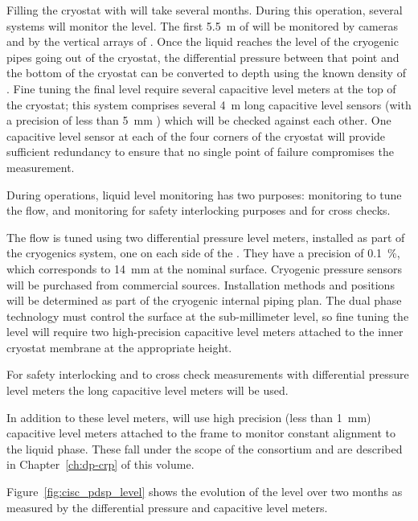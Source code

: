 Filling the cryostat with \lar will take several months. During this operation, several systems will monitor the \lar level. 
The first \SI{5.5}{m} of  will be monitored by cameras and by the vertical arrays of . Once the liquid reaches the level of the cryogenic pipes going out of the cryostat, 
the differential pressure between that point and the bottom of the cryostat
can be converted to depth using
the known density of \lar.  Fine tuning the final  level require several capacitive level meters at the top of the cryostat; this system comprises several \SI{4}{m}  long capacitive level sensors (with a precision of less than \SI{5}{mm} ) which will be checked against each other. One capacitive level sensor at each of the four corners of the cryostat will provide sufficient redundancy to ensure that no single point of failure compromises the %
measurement.


During operations, liquid level monitoring has two purposes:
monitoring to tune the \lar flow, and monitoring for safety interlocking purposes and for cross checks. 


The \lar flow is tuned using two differential pressure level meters, installed as part of the cryogenics system, one on each side of the .  They have a precision of \SI{0.1}{\%}, which corresponds to \SI{14}{mm} at the nominal  surface. Cryogenic pressure sensors will be purchased from commercial sources. Installation methods and positions will be determined as part of the cryogenic internal piping plan. 
The dual phase technology must control the  surface at the sub-millimeter level, so fine tuning the  level will require two high-precision capacitive level meters attached to the inner cryostat membrane at the appropriate height.   


For %
safety interlocking and to cross check measurements with differential pressure level meters the long capacitive level meters will be used. 


In addition to these level meters,  will use high precision (less than \SI{1}{mm}) capacitive level meters attached to the  frame to monitor constant  alignment to the liquid phase. These fall under the scope of the  consortium and are described in Chapter~\ref{ch:dp-crp} of this  volume.

Figure~\ref{fig:cisc_pdsp_level} shows the evolution of the   level over two months as measured by the differential pressure and capacitive level meters. 

